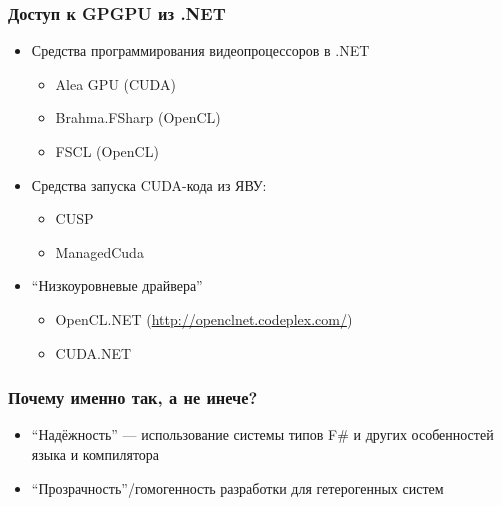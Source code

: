 \documentclass[xcolor=table]{beamer}
\begin{document}
\begin{frame}[fragile]
  \transwipe[direction=90]
  \frametitle{Доступ к GPGPU из .NET}
  \begin{itemize}
  \item Средства программирования видеопроцессоров в .NET
  \begin{itemize}
     \item Alea GPU (CUDA)
     \item Brahma.FSharp (OpenCL)
     \item FSCL (OpenCL)
  \end{itemize}
  \item Средства запуска CUDA-кода из ЯВУ:
  \begin{itemize}
     \item CUSP
     \item ManagedCuda
  \end{itemize}
  \item ``Низкоуровневые драйвера''
  \begin{itemize}
     \item OpenCL.NET (\url{http://openclnet.codeplex.com/})
     \item CUDA.NET
  \end{itemize}
  \end{itemize}
\end{frame}


\begin{frame}[fragile]
  \transwipe[direction=90]
  \frametitle{Почему именно так, а не инече?}
      \begin{itemize}
        \item ``Надёжность'' --- использование системы типов F\# и других особенностей языка и компилятора
        \item ``Прозрачность''/гомогенность разработки для гетерогенных систем
      \end{itemize}
\end{frame}
\end{document}
